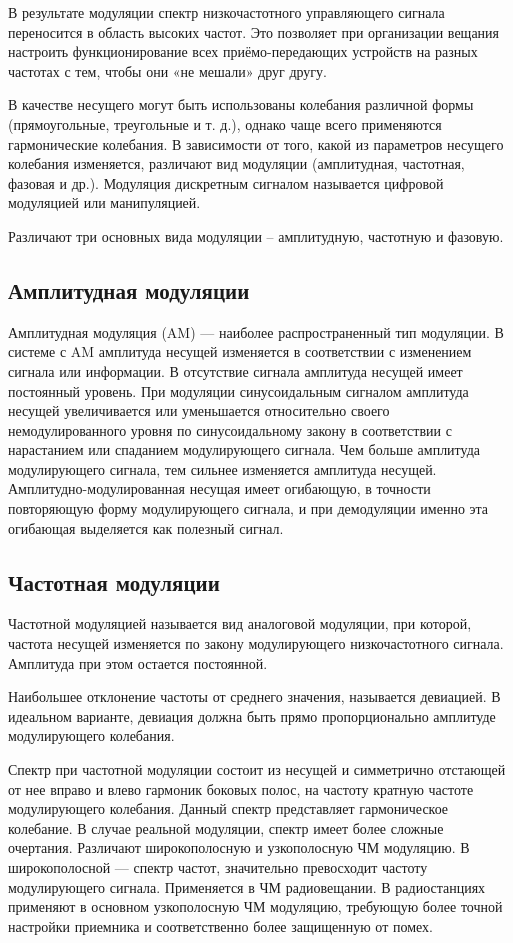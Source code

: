 \documentclass[a4paper,14pt]{extarticle}
\begin{document}
В результате модуляции спектр низкочастотного управляющего сигнала переносится в область высоких частот. Это позволяет при организации вещания настроить функционирование всех приёмо-передающих устройств на разных частотах с тем, чтобы они «не мешали» друг другу.

В качестве несущего могут быть использованы колебания различной формы (прямоугольные, треугольные и т. д.), однако чаще всего применяются гармонические колебания. В зависимости от того, какой из параметров несущего колебания изменяется, различают вид модуляции (амплитудная, частотная, фазовая и др.). Модуляция дискретным сигналом называется цифровой модуляцией или манипуляцией.

Различают три основных вида модуляции – амплитудную, частотную и фазовую.

\subsection{Амплитудная модуляции}

Амплитудная модуляция (AM) — наиболее распространенный тип модуляции. В системе с AM амплитуда несущей изменяется в соответствии с изменением сигнала или информации. В отсутствие сигнала амплитуда несущей имеет постоянный уровень. При модуляции синусоидальным сигналом амплитуда несущей увеличивается или уменьшается относительно своего немодулированного уровня по синусоидальному закону в соответствии с нарастанием или спаданием модулирующего сигнала. Чем больше амплитуда модулирующего сигнала, тем сильнее изменяется амплитуда несущей. Амплитудно-модулированная несущая имеет огибающую, в точности повторяющую форму модулирующего сигнала, и при демодуляции именно эта огибающая выделяется как полезный сигнал.

\subsection{Частотная модуляции}

Частотной модуляцией называется вид аналоговой модуляции, при которой, частота несущей изменяется по закону модулирующего низкочастотного сигнала. Амплитуда при этом остается постоянной.

Наибольшее отклонение частоты от среднего значения, называется девиацией.
В идеальном варианте, девиация должна быть прямо пропорционально амплитуде модулирующего колебания.

Спектр при частотной модуляции состоит из несущей и симметрично отстающей от нее вправо и влево гармоник боковых полос, на частоту кратную частоте модулирующего колебания.
Данный спектр представляет гармоническое колебание. В случае реальной модуляции, спектр имеет более сложные очертания.
Различают широкополосную и узкополосную ЧМ модуляцию.
В широкополосной — спектр частот, значительно превосходит частоту модулирующего сигнала. Применяется в ЧМ радиовещании.
В радиостанциях применяют в основном узкополосную ЧМ модуляцию, требующую более точной настройки приемника и соответственно более защищенную от помех.
\end{document}
